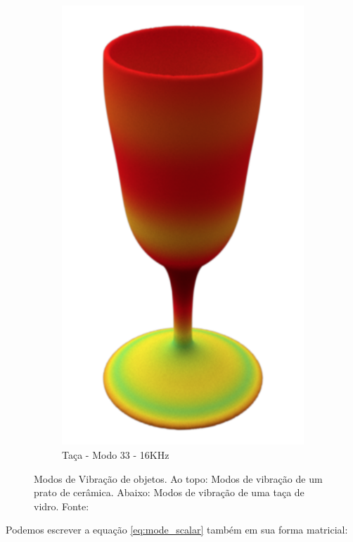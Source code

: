 \begin{figure}[ht]
\begin{subfigure}{0.32\textwidth}
	\includegraphics[height=0.2\textheight]{mathematicalbackground/modes/glass_33.png}
	\caption{Taça - Modo 33 - 16KHz}\label{fig:glass_33}
\end{subfigure}%
\caption[Modos de Vibração de objetos]{Modos de Vibração de objetos. Ao topo: Modos de vibração de um prato de cerâmica. Abaixo: Modos de vibração de uma taça de vidro. Fonte: \cite{langlois2014eigenmode}}
\label{fig:sample_modes}
\end{figure}

Podemos escrever a equação \eqref{eq:mode_scalar} também em sua forma matricial:

